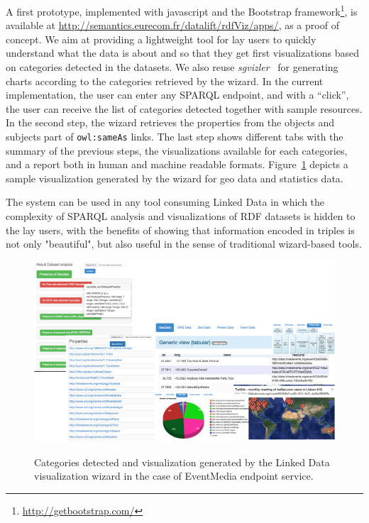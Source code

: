 A first prototype, implemented with javascript and the Bootstrap framework\footnote{\url{http://getbootstrap.com/}}, is available at \url{http://semantics.eurecom.fr/datalift/rdfViz/apps/}, as a proof of concept. We aim at providing a lightweight tool for lay users to quickly understand what the data is about and so that they get first visualizations based on categories detected in the datasets. We also reuse \textit{sgvizler}~\cite{Martin2012} for generating charts according to the categories retrieved by the wizard. In the current implementation, the user can enter any SPARQL endpoint, and with a ``click'', the user can receive the list of categories detected together with sample resources. In the second step, the wizard retrieves the properties from the objects and subjects part of \texttt{owl:sameAs} links. The last step shows different tabs with the summary of the previous steps, the visualizations available for each categories, and a report both in human and machine readable formats. Figure~\ref{fig:visuSample} depicts a sample visualization generated by the wizard for geo data and statistics data.

The system can be used in any tool consuming Linked Data in which the complexity of SPARQL analysis and visualizations of RDF datasets is hidden to the lay users, with the benefits of showing that information encoded in triples is not only "beautiful", but also useful in the sense of traditional wizard-based tools.


\begin{figure}[ht!b]
\includegraphics[scale=.6]{img/result-wizviz.pdf}
\label{fig:visuSample}
\caption{Categories detected and visualization generated by the Linked Data visualization wizard in the case of EventMedia endpoint service. }
\end{figure}

